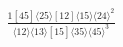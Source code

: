 \documentclass[varwidth, border=5pt]{standalone}
\begin{document}
\begin{my}
$\begin{gathered}
\scriptscriptstyle\frac{1[45]⟨25⟩[12]⟨15⟩⟨24⟩^2}{⟨12⟩⟨13⟩[15]⟨35⟩⟨45⟩^3}
\end{gathered}$
\end{my}
\end{document}
